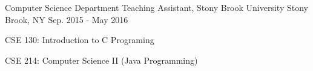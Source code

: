 \begin{cventries}
\cventry
{Computer Science Department} %
{Teaching Assistant, Stony Brook University} %
{Stony Brook, NY} %
{Sep. 2015 - May 2016} %
{ %
\begin{cvitems}
\item{CSE 130: Introduction to C Programing}
\item{CSE 214: Computer Science II (Java Programming)}
\end{cvitems}
}



\end{cventries}